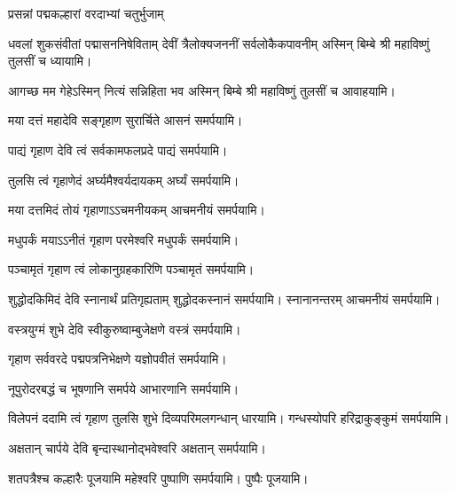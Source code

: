 \begin{center}

{प्रसन्नां पद्मकल्हारां वरदाभ्यां चतुर्भुजाम्}

{धवलां शुकसंवीतां पद्मासननिषेविताम्}
{देवीं त्रैलोक्यजननीं सर्वलोकैकपावनीम्}
अस्मिन् बिम्बे श्री महाविष्णुं तुलसीं च ध्यायामि।

{आगच्छ मम गेहेऽस्मिन् नित्यं सन्निहिता भव}
अस्मिन् बिम्बे श्री महाविष्णुं तुलसीं च आवाहयामि।
\medskip

\medskip
{}
{मया दत्तं महादेवि सङ्गृहाण सुरार्चिते}
 आसनं समर्पयामि।\medskip

{पाद्यं गृहाण देवि त्वं सर्वकामफलप्रदे}
 पाद्यं समर्पयामि।\medskip

{तुलसि त्वं गृहाणेदं अर्घ्यमैश्वर्यदायकम्}
 अर्घ्यं समर्पयामि।\medskip

{मया दत्तमिदं तोयं गृहाणाऽऽचमनीयकम्}
 आचमनीयं समर्पयामि।\medskip

{मधुपर्कं मयाऽऽनीतं गृहाण परमेश्वरि}
मधुपर्कं समर्पयामि।\medskip

{पञ्चामृतं गृहाण त्वं लोकानुग्रहकारिणि}
पञ्चामृतं समर्पयामि।\medskip


{शुद्धोदकिमिदं देवि स्नानार्थं प्रतिगृह्यताम्}
 शुद्धोदकस्नानं समर्पयामि। स्नानानन्तरम् आचमनीयं समर्पयामि।\medskip

 {वस्त्रयुग्मं शुभे देवि स्वीकुरुष्वाम्बुजेक्षणे}
 वस्त्रं समर्पयामि।\medskip

{गृहाण सर्ववरदे पद्मपत्रनिभेक्षणे}
 यज्ञोपवीतं समर्पयामि।\medskip

{नूपुरोदरबद्धं च भूषणानि समर्पये}
आभारणानि समर्पयामि।\medskip
 
{विलेपनं ददामि त्वं गृहाण तुलसि शुभे}
 दिव्यपरिमलगन्धान् धारयामि। गन्धस्योपरि हरिद्राकुङ्कुमं समर्पयामि। 

{अक्षतान् चार्पये देवि बृन्दास्थानोद्भवेश्वरि}
अक्षतान् समर्पयामि।\medskip

{शतपत्रैश्च कल्हारैः पूजयामि महेश्वरि}
 पुष्पाणि समर्पयामि।  पुष्पैः पूजयामि।
\end{center}


